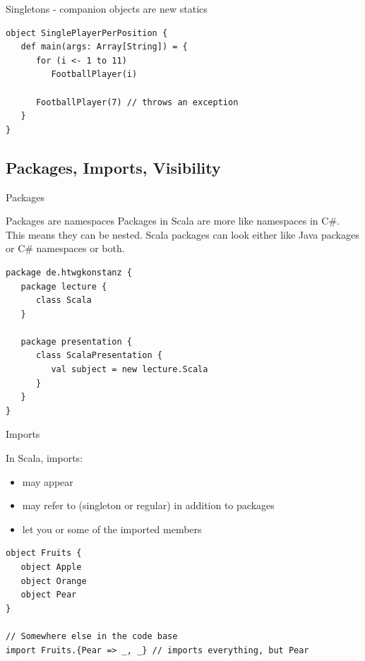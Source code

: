 \begin{frame}[fragile]{Singletons - companion objects are new statics}
\begin{lstlisting}
object SinglePlayerPerPosition {
   def main(args: Array[String]) = {
      for (i <- 1 to 11)
         FootballPlayer(i)

      FootballPlayer(7) // throws an exception
   }
}
\end{lstlisting}
\end{frame}

\subsection{Packages, Imports, Visibility}

\begin{frame}[fragile]{Packages}
\begin{block}{Packages are namespaces}
Packages in Scala are more like namespaces in C\#. This means they can be
nested. Scala packages can look either like Java packages or C\# namespaces or
both.
\end{block}
\pause
\begin{lstlisting}
package de.htwgkonstanz {
   package lecture {
      class Scala
   }
   
   package presentation {
      class ScalaPresentation {
         val subject = new lecture.Scala
      }
   }
}
\end{lstlisting}
\end{frame}

\begin{frame}[fragile]{Imports}
\begin{block}{In Scala, imports:}
\begin{itemize}
  \item may appear 
  \item may refer to  (singleton or regular) in addition to
  packages
  \item let you  or  some of the imported
  members
\end{itemize}
\end{block}
\pause
\begin{lstlisting}
object Fruits {
   object Apple
   object Orange
   object Pear
}

// Somewhere else in the code base
import Fruits.{Pear => _, _} // imports everything, but Pear
\end{lstlisting}
\end{frame}

